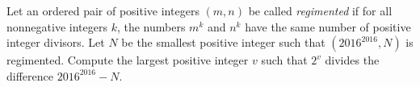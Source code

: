 Let an ordered pair of positive integers $(m, n)$ be called \emph{regimented} if for all nonnegative integers $k$, the numbers $m^k$ and $n^k$ have the same number of positive integer divisors. Let $N$ be the smallest positive integer such that $\left(2016^{2016}, N\right)$ is regimented. Compute the largest positive integer $v$ such that $2^v$ divides the difference $2016^{2016}-N$.
